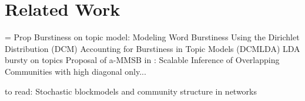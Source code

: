 \section{Related Work}
= Prop
Burstiness on topic model:
Modeling Word Burstiness Using the Dirichlet Distribution (DCM)
Accounting for Burstiness in Topic Models (DCMLDA)
LDA bursty on topics
Proposal of a-MMSB in : Scalable Inference of Overlapping Communities
with high diagonal only...

to read: Stochastic blockmodels and community structure in networks



